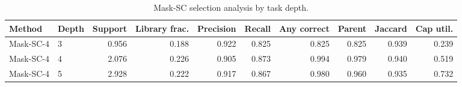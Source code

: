 \begin{table}[ht]
    \caption{Mask-SC selection analysis by task depth.}
    \label{tbl:masksc_selection_depth}
    \centering
    \scriptsize
    \begin{tabular}{llrrrrrrrr}
    \toprule
Method & Depth & Support & Library frac. & Precision & Recall & Any correct & Parent & Jaccard & Cap util. \\
    \midrule
Mask-SC-4 & 3 & 0.956 & 0.188 & 0.922 & 0.825 & 0.825 & 0.825 & 0.939 & 0.239 \\
Mask-SC-4 & 4 & 2.076 & 0.226 & 0.905 & 0.873 & 0.994 & 0.979 & 0.940 & 0.519 \\
Mask-SC-4 & 5 & 2.928 & 0.222 & 0.917 & 0.867 & 0.980 & 0.960 & 0.935 & 0.732 \\
    \bottomrule
    \end{tabular}
\end{table}
